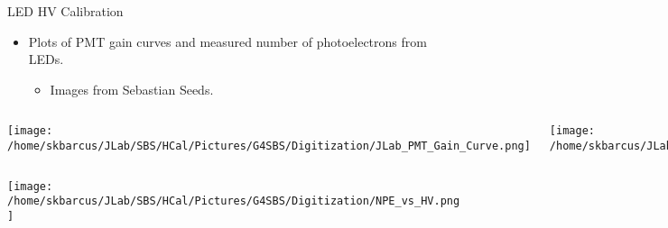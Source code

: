 \documentclass[10pt]{beamer}
\begin{document}
\begin{frame}{LED HV Calibration}
	\vspace{-1mm}
	\begin{itemize}
		\item Plots of PMT gain curves and measured number of photoelectrons from LEDs.
		\begin{itemize}
			\item[--] Images from Sebastian Seeds.
		\end{itemize}
	\end{itemize}
	
	\vspace{-7mm}
	\begin{columns}[T,onlytextwidth]
	
	\begin{center}
  		\texttt{[image: /home/skbarcus/JLab/SBS/HCal/Pictures/G4SBS/Digitization/JLab\_PMT\_Gain\_Curve.png]}
  	\end{center}
	
	\vspace{-7mm}
	
	\begin{center}
  		\texttt{[image: /home/skbarcus/JLab/SBS/HCal/Pictures/G4SBS/Digitization/CMU\_PMT\_Gain\_Curve.png]}
  	\end{center}
	
	\end{columns}
	
	\vspace{-4mm}
	\begin{center}
  		\texttt{[image: /home/skbarcus/JLab/SBS/HCal/Pictures/G4SBS/Digitization/NPE\_vs\_HV.png]}
  	\end{center}

\end{frame}
\end{document}
